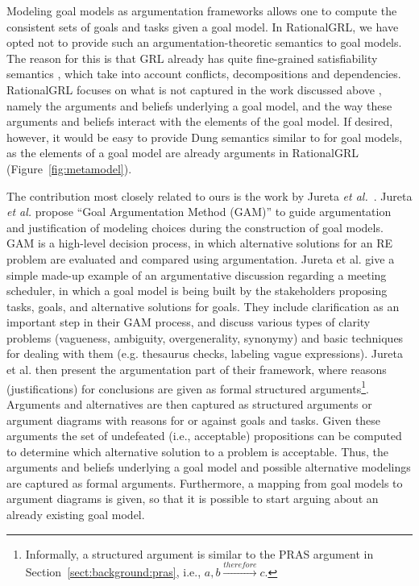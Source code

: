 Modeling goal models as argumentation frameworks allows one to compute the consistent sets of goals and tasks given a goal model. In RationalGRL, we have opted not to provide such an argumentation-theoretic semantics to goal models. The reason for this is that GRL already has quite fine-grained satisfiability semantics \cite{Amyot:2010:EGM:1841349.1841356}, which take into account conflicts, decompositions and dependencies. RationalGRL focuses on what is not captured in the work discussed above \cite{bagheri2011consolidating,MirbelVillata12}, namely the arguments and beliefs underlying a goal model, and the way these arguments and beliefs interact with the elements of the goal model. If desired, however, it would be easy to provide Dung semantics similar to \cite{bagheri2011consolidating,MirbelVillata12} for goal models, as the elements of a goal model are already arguments in RationalGRL (Figure~\ref{fig:metamodel}). 

The contribution most closely related to ours is the work by Jureta \emph{et al.}~\cite{Jureta:RE2008}. Jureta \emph{et al.} propose ``Goal Argumentation Method (GAM)'' to guide argumentation and justification of modeling choices during the construction of goal models. GAM is a high-level decision process, in which alternative solutions for an RE problem are evaluated and compared using argumentation. Jureta et al. give a simple made-up example of an argumentative discussion regarding a meeting scheduler, in which a goal model is being built by the stakeholders proposing tasks, goals, and alternative solutions for goals. They include clarification as an important step in their GAM process, and discuss various types of clarity problems (vagueness, ambiguity, overgenerality, synonymy) and basic techniques for dealing with them (e.g. thesaurus checks, labeling vague expressions). Jureta et al. then present the argumentation part of their framework, where reasons (justifications) for conclusions are given as formal structured arguments\footnote{Informally, a structured argument is similar to the PRAS argument in Section~\ref{sect:background:pras}, i.e., $a, b \xrightarrow{therefore} c$.}. Arguments and alternatives are then captured as structured arguments or argument diagrams with reasons for or against goals and tasks. Given these arguments the set of undefeated (i.e., acceptable) propositions can be computed to determine which alternative solution to a problem is acceptable. Thus, the arguments and beliefs underlying a goal model and possible alternative modelings are captured as formal arguments. Furthermore, a mapping from goal models to argument diagrams is given, so that it is possible to start arguing about an already existing goal model.

